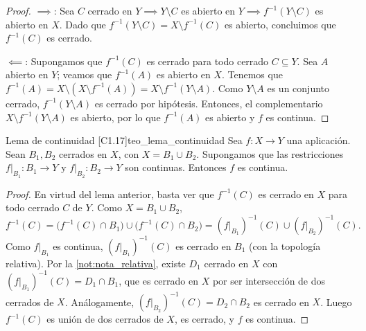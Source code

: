 \begin{proof}
$\implies$: Sea $C$ cerrado en $Y \implies Y \setminus C$ es abierto en $Y \implies f^{-1}(Y \setminus C)$ es abierto en $X$. Dado que $f^{-1}(Y \setminus C) = X \setminus f^{-1}(C)$ es abierto, concluimos que $f^{-1}(C)$ es cerrado.

$\impliedby$: Supongamos que $f^{-1}(C)$ es cerrado para todo cerrado $C \subseteq Y$. Sea $A$ abierto en $Y$; veamos que $f^{-1}(A)$ es abierto en $X$.
Tenemos que $f^{-1}(A) = X \setminus (X \setminus f^{-1}(A)) = X \setminus f^{-1}(Y \setminus A)$. Como $Y \setminus A$ es un conjunto cerrado, $f^{-1}(Y \setminus A)$ es cerrado por hipótesis. Entonces, el complementario $X \setminus f^{-1}(Y \setminus A)$ es abierto, por lo que $f^{-1}(A)$ es abierto y $f$ es continua.
\end{proof}

\begin{teorema}{Lema de continuidad [C1.17]}{teo_lema_continuidad}
Sea $f \colon X \to Y$ una aplicación. Sean $B_1, B_2$ cerrados en $X$, con $X = B_1 \cup B_2$. Supongamos que las restricciones $f|_{B_1} \colon B_1 \to Y$ y $f|_{B_2} \colon B_2 \to Y$ son continuas. Entonces $f$ es continua.
\end{teorema}

\begin{proof}
En virtud del lema anterior, basta ver que $f^{-1}(C)$ es cerrado en $X$ para todo cerrado $C$ de $Y$. Como $X = B_1 \cup B_2$,
\[ f^{-1}(C) = \big(f^{-1}(C) \cap B_1\big) \cup \big(f^{-1}(C) \cap B_2\big) = (f|_{B_1})^{-1}(C) \cup (f|_{B_2})^{-1}(C). \]
Como $f|_{B_1}$ es continua, $(f|_{B_1})^{-1}(C)$ es cerrado en $B_1$ (con la topología relativa). Por la \cref{not:nota_relativa}, existe $D_1$ cerrado en $X$ con $(f|_{B_1})^{-1}(C) = D_1 \cap B_1$, que es cerrado en $X$ por ser intersección de dos cerrados de $X$. Análogamente, $(f|_{B_2})^{-1}(C) = D_2 \cap B_2$ es cerrado en $X$. Luego $f^{-1}(C)$ es unión de dos cerrados de $X$, es cerrado, y $f$ es continua.
\end{proof}